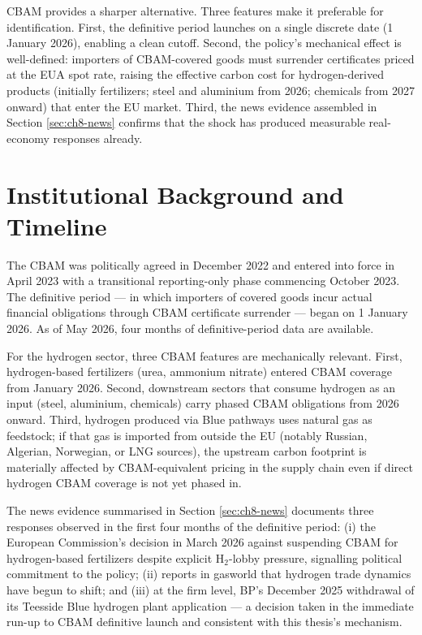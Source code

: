 \documentclass[11pt,a4paper]{article}
\begin{document}
CBAM provides a sharper alternative. Three features make it preferable for identification. First, the definitive period launches on a single discrete date (1 January 2026), enabling a clean cutoff. Second, the policy's mechanical effect is well-defined: importers of CBAM-covered goods must surrender certificates priced at the EUA spot rate, raising the effective carbon cost for hydrogen-derived products (initially fertilizers; steel and aluminium from 2026; chemicals from 2027 onward) that enter the EU market. Third, the news evidence assembled in Section \ref{sec:ch8-news} confirms that the shock has produced measurable real-economy responses already.

\section{Institutional Background and Timeline}
\label{sec:ch8-institutional}

The CBAM was politically agreed in December 2022 and entered into force in April 2023 with a transitional reporting-only phase commencing October 2023. The definitive period --- in which importers of covered goods incur actual financial obligations through CBAM certificate surrender --- began on 1 January 2026. As of May 2026, four months of definitive-period data are available.

For the hydrogen sector, three CBAM features are mechanically relevant. First, hydrogen-based fertilizers (urea, ammonium nitrate) entered CBAM coverage from January 2026. Second, downstream sectors that consume hydrogen as an input (steel, aluminium, chemicals) carry phased CBAM obligations from 2026 onward. Third, hydrogen produced via Blue pathways uses natural gas as feedstock; if that gas is imported from outside the EU (notably Russian, Algerian, Norwegian, or LNG sources), the upstream carbon footprint is materially affected by CBAM-equivalent pricing in the supply chain even if direct hydrogen CBAM coverage is not yet phased in.

The news evidence summarised in Section \ref{sec:ch8-news} documents three responses observed in the first four months of the definitive period: (i) the European Commission's decision in March 2026 against suspending CBAM for hydrogen-based fertilizers despite explicit H$_2$-lobby pressure, signalling political commitment to the policy; (ii) reports in gasworld that hydrogen trade dynamics have begun to shift; and (iii) at the firm level, BP's December 2025 withdrawal of its Teesside Blue hydrogen plant application --- a decision taken in the immediate run-up to CBAM definitive launch and consistent with this thesis's mechanism.
\end{document}
